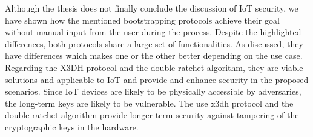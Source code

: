 Although the thesis does not finally conclude the discussion of IoT security, we have shown how the mentioned bootstrapping protocols achieve their goal without manual input from the user during the process. 
Despite the highlighted differences, both protocols share a large set of functionalities.
As discussed, they have differences which makes one or the other better depending on the use case. 
Regarding the X3DH protocol and the double ratchet algorithm, they are viable solutions and applicable to IoT and provide and enhance security in the proposed scenarios.
Since IoT devices are likely to be physically accessible by adversaries, the long-term keys are likely to be vulnerable. The use \gls{x3dh} protocol and the double ratchet algorithm provide longer term security against tampering of the cryptographic keys in the hardware.

